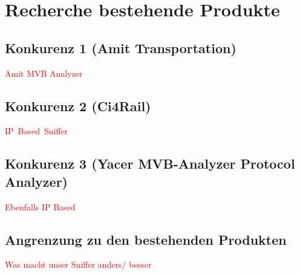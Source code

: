 \section{Recherche bestehende Produkte}


\subsection{Konkurenz 1 (Amit Transportation)}
\textcolor{red}{Amit MVB Analyzer}



\subsection{Konkurenz 2 (Ci4Rail)}
\textcolor{red}{IP\ Based\ Sniffer}



\subsection{Konkurenz 3 (Yacer MVB-Analyzer Protocol Analyzer)}
\textcolor{red}{Ebenfalls IP Based}



\subsection{Angrenzung zu den bestehenden Produkten}
\textcolor{red}{Was macht unser Sniffer anders/ besser}


